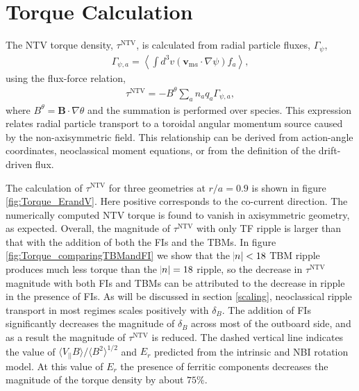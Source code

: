 \documentclass[aip, pop, preprint]{revtex4-1}
\numberwithin{figure}{section}
\numberwithin{equation}{section}
\begin{document}
\FloatBarrier

\section{Torque Calculation}\label{torque}

The NTV torque density, $\tau^{\text{NTV}}$, is calculated from radial particle fluxes, $\Gamma_{\psi}$, 
\begin{gather}
\Gamma_{\psi,a} = \left \langle \int d^3v (\bm{v}_{\text{m}a} \cdot \nabla \psi) f_a \right \rangle,
\label{eq:particleflux}
\end{gather}
using the flux-force relation,
\begin{gather}
\tau^{\text{NTV}} = - B^{\theta} \sum_a n_a q_a \Gamma_{\psi, a},
\end{gather}
where $B^{\theta} = \bm{B} \cdot \nabla \theta$ and the summation is performed over species. This expression relates radial particle transport to a toroidal angular momentum source caused by the non-axisymmetric field. This relationship can be derived from action-angle coordinates,\cite{Albert2016} neoclassical moment equations,\cite{Shaing1986} or from the definition of the drift-driven flux.\cite{Shaing2006} 

The calculation of $\tau^{\text{NTV}}$ for three geometries at $r/a = 0.9$ is shown in figure \ref{fig:Torque_ErandV}. Here positive corresponds to the co-current direction. The numerically computed NTV torque is found to vanish in axisymmetric geometry, as expected. Overall, the magnitude of $\tau^{\text{NTV}}$ with only TF ripple is larger than that with the addition of both the FIs and the TBMs.  In figure \ref{fig:Torque_comparingTBMandFI} we show that the $\abs{n} < 18$ TBM  ripple produces much less torque than the $\abs{n} = 18$ ripple, so the decrease in $\tau^{\text{NTV}}$ magnitude with both FIs and TBMs can be attributed to the decrease in ripple in the presence of FIs. As will be discussed in section \ref{scaling}, neoclassical ripple transport in most regimes scales positively with $\delta_B$. The addition of FIs significantly decreases the magnitude of $\delta_B$ across most of the outboard side, and as a result the magnitude of $\tau^{\text{NTV}}$ is reduced. The dashed vertical line indicates the value of $\langle V_{||} B\rangle/\langle B^2 \rangle^{1/2}$ and $E_r$ predicted from the intrinsic and NBI rotation model. At this value of $E_r$ the presence of ferritic components decreases the magnitude of the torque density by about $75\%$. 
\end{document}
